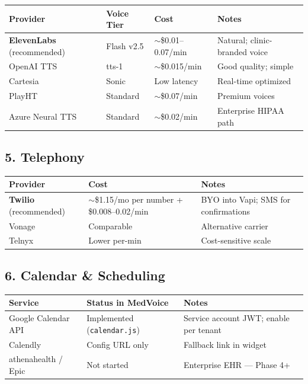\documentclass[11pt,a4paper]{article}
\begin{document}
\begin{center}
\small
\begin{tabular}{@{}llll@{}}
\toprule
\textbf{Provider} & \textbf{Voice Tier} & \textbf{Cost} & \textbf{Notes} \\
\midrule
\textbf{ElevenLabs} (recommended) & Flash v2.5 & $\sim$\$0.01--0.07/min & Natural; clinic-branded voice \\
OpenAI TTS & tts-1 & $\sim$\$0.015/min & Good quality; simple \\
Cartesia & Sonic & Low latency & Real-time optimized \\
PlayHT & Standard & $\sim$\$0.07/min & Premium voices \\
Azure Neural TTS & Standard & $\sim$\$0.02/min & Enterprise HIPAA path \\
\bottomrule
\end{tabular}
\end{center}

\subsection{5. Telephony}

\begin{center}
\small
\begin{tabular}{@{}lll@{}}
\toprule
\textbf{Provider} & \textbf{Cost} & \textbf{Notes} \\
\midrule
\textbf{Twilio} (recommended) & $\sim$\$1.15/mo per number + \$0.008--0.02/min & BYO into Vapi; SMS for confirmations \\
Vonage & Comparable & Alternative carrier \\
Telnyx & Lower per-min & Cost-sensitive scale \\
\bottomrule
\end{tabular}
\end{center}

\subsection{6. Calendar \& Scheduling}

\begin{center}
\small
\begin{tabular}{@{}lll@{}}
\toprule
\textbf{Service} & \textbf{Status in MedVoice} & \textbf{Notes} \\
\midrule
Google Calendar API & Implemented (\texttt{calendar.js}) & Service account JWT; enable per tenant \\
Calendly & Config URL only & Fallback link in widget \\
athenahealth / Epic & Not started & Enterprise EHR --- Phase 4+ \\
\bottomrule
\end{tabular}
\end{center}
\end{document}
